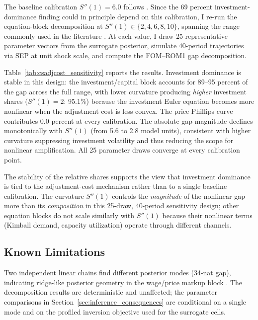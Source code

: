 \documentclass[12pt]{article}
\theoremstyle{plain}
\theoremstyle{definition}
\theoremstyle{remark}
\begin{document}
The baseline calibration $S''(1) = 6.0$ follows \citet{smets2007shocks}. Since the 69 percent investment-dominance finding could in principle depend on this calibration, I re-run the equation-block decomposition at $S''(1) \in \{2, 4, 6, 8, 10\}$, spanning the range commonly used in the literature \citep{christiano2005nominal,justiniano2010investment}. At each value, I draw 25 representative parameter vectors from the surrogate posterior, simulate 40-period trajectories via SEP at unit shock scale, and compute the FOM--ROM1 gap decomposition.

Table~\ref{tab:csadjcost_sensitivity} reports the results. Investment dominance is stable in this design: the investment/capital block accounts for 89--95 percent of the gap across the full range, with lower curvature producing \emph{higher} investment shares ($S''(1) = 2$: 95.1\%) because the investment Euler equation becomes more nonlinear when the adjustment cost is less convex. The price Phillips curve contributes 0.0 percent at every calibration. The absolute gap magnitude declines monotonically with $S''(1)$ (from 5.6 to 2.8 model units), consistent with higher curvature suppressing investment volatility and thus reducing the scope for nonlinear amplification. All 25 parameter draws converge at every calibration point.

The stability of the relative shares supports the view that investment dominance is tied to the adjustment-cost mechanism rather than to a single baseline calibration. The curvature $S''(1)$ controls the \emph{magnitude} of the nonlinear gap more than its \emph{composition} in this 25-draw, 40-period sensitivity design; other equation blocks do not scale similarly with $S''(1)$ because their nonlinear terms (Kimball demand, capacity utilization) operate through different channels.



\subsection{Known Limitations}
\label{subsec:known_limitations}

Two independent linear chains find different posterior modes (34-nat gap), indicating ridge-like posterior geometry in the wage/price markup block \citep{herbst2016sequential}. The decomposition results are deterministic and unaffected; the parameter comparisons in Section~\ref{sec:inference_consequences} are conditional on a single mode and on the profiled inversion objective used for the surrogate cells.
\end{document}
